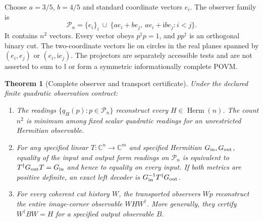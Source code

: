 \documentclass[11pt,a4paper]{article}
\newtheorem{theorem}{Theorem}
\newcommand{\adj}{\dagger}
\newcommand{\ii}{\mathrm{i}}
\newcommand{\Id}{\mathbb I}
\newcommand{\Herm}{\operatorname{Herm}}
\newcommand{\qform}[2]{q_{#1}(#2)}
\begin{document}
Choose $a=3/5$, $b=4/5$ and standard coordinate vectors $e_i$. The observer
family is
\begin{equation}\label{eq:probes}
\mathcal P_n=\{e_i\}_i\ \cup\
\{ae_i+be_j,\ ae_i+\ii be_j: i<j\}.
\end{equation}
It contains $n^2$ vectors. Every vector obeys $p^\adj p=1$, and $pp^\adj$
is an orthogonal binary cut. The two-coordinate vectors lie on circles in
the real planes spanned by $(e_i,e_j)$ or $(e_i,\ii e_j)$. The projectors
are separately accessible tests and are not asserted to sum to $\Id$ or
form a symmetric informationally complete POVM.

\begin{theorem}[Complete observer and transport certificate]\label{thm:main}
Under the declared finite quadratic observation contract:
\begin{enumerate}
\item The readings $\{\qform{H}{p}:p\in\mathcal P_n\}$ reconstruct every
$H\in\Herm(n)$. The count $n^2$ is minimum among fixed scalar quadratic
readings for an unrestricted Hermitian observable.
\item For any specified linear $T:\mathbb C^n\to\mathbb C^m$ and specified
Hermitian $G_{\rm in},G_{\rm out}$, equality of the input and output form
readings on $\mathcal P_n$ is equivalent to
$T^\adj G_{\rm out}T=G_{\rm in}$ and hence to equality on every input.
If both metrics are positive definite, an exact left decoder is
$G_{\rm in}^{-1}T^\adj G_{\rm out}$.
\item For every coherent cut history $W$, the transported observers $Wp$
reconstruct the entire image-corner observable $WHW^\adj$. More generally,
they certify $W^\adj BW=H$ for a specified output observable $B$.
\end{enumerate}
\end{theorem}
\end{document}
